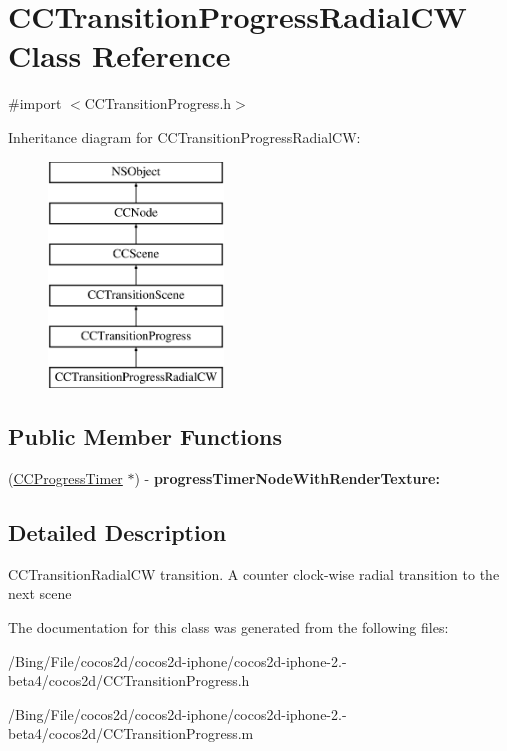 \hypertarget{interface_c_c_transition_progress_radial_c_w}{\section{C\-C\-Transition\-Progress\-Radial\-C\-W Class Reference}
\label{interface_c_c_transition_progress_radial_c_w}
}


{\ttfamily \#import $<$C\-C\-Transition\-Progress.\-h$>$}

Inheritance diagram for C\-C\-Transition\-Progress\-Radial\-C\-W\-:\begin{figure}[H]
\begin{center}
\leavevmode
\includegraphics[height=6.000000cm]{interface_c_c_transition_progress_radial_c_w}
\end{center}
\end{figure}
\subsection*{Public Member Functions}
\begin{DoxyCompactItemize}
\item 
\hypertarget{interface_c_c_transition_progress_radial_c_w_a972b3e10c947e1553b857443dec7372b}{(\hyperlink{interface_c_c_progress_timer}{C\-C\-Progress\-Timer} $\ast$) -\/ {\bfseries progress\-Timer\-Node\-With\-Render\-Texture\-:}}\label{interface_c_c_transition_progress_radial_c_w_a972b3e10c947e1553b857443dec7372b}

\end{DoxyCompactItemize}


\subsection{Detailed Description}
C\-C\-Transition\-Radial\-C\-W transition. A counter clock-\/wise radial transition to the next scene 

The documentation for this class was generated from the following files\-:\begin{DoxyCompactItemize}
\item 
/\-Bing/\-File/cocos2d/cocos2d-\/iphone/cocos2d-\/iphone-\/2.-\/beta4/cocos2d/C\-C\-Transition\-Progress.\-h\item 
/\-Bing/\-File/cocos2d/cocos2d-\/iphone/cocos2d-\/iphone-\/2.-\/beta4/cocos2d/C\-C\-Transition\-Progress.\-m\end{DoxyCompactItemize}
